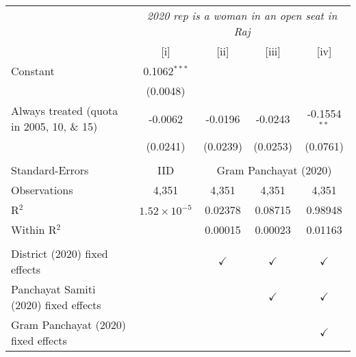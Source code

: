 
\begingroup
\centering
\begin{tabular}{lcccc}
   \toprule
    & \multicolumn{4}{c}{\textit{2020 rep is a woman in an open seat in Raj}}\\
                                              & [i]                   & [ii]          & [iii]         & [iv]\\  
   \midrule 
   Constant                                   & 0.1062$^{***}$        &               &               &   \\   
                                              & (0.0048)              &               &               &   \\   
   Always treated (quota in 2005, 10, \& 15)  & -0.0062               & -0.0196       & -0.0243       & -0.1554$^{**}$\\   
                                              & (0.0241)              & (0.0239)      & (0.0253)      & (0.0761)\\   
    \\
   Standard-Errors & IID & \multicolumn{3}{c}{Gram Panchayat (2020)} \\ 
   Observations                               & 4,351                 & 4,351         & 4,351         & 4,351\\  
   R$^2$                                      & $1.52\times 10^{-5}$  & 0.02378       & 0.08715       & 0.98948\\  
   Within R$^2$                               &                       & 0.00015       & 0.00023       & 0.01163\\  
    \\
   District (2020) fixed effects              &                       & $\checkmark$  & $\checkmark$  & $\checkmark$\\   
   Panchayat Samiti (2020) fixed effects      &                       &               & $\checkmark$  & $\checkmark$\\   
   Gram Panchayat (2020) fixed effects        &                       &               &               & $\checkmark$\\   
   \bottomrule
\end{tabular}
\par\endgroup



